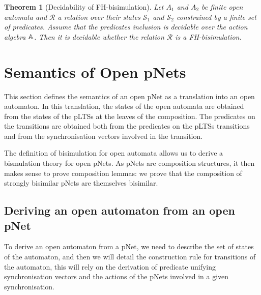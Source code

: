 \documentclass{lmcs}
\newtheorem{theorem}{Theorem}
\begin{document}
\begin{theorem}[Decidability of FH-bisimulation]
Let $A_1$ and $A_2$ be finite open automata
and $\mathcal{R}$ a relation over their states $\mathcal{S}_1$ and
$\mathcal{S}_2$ constrained by a finite set of predicates. Assume that
the predicates inclusion is decidable over  
the action algebra $\mathbb{A}$. Then it is decidable whether the relation 
$\mathcal{R}$ is a FH-bisimulation.
  
\end{theorem}



\section{Semantics of Open pNets}
\label{section:op-semantics}

This section defines the semantics of an open pNet as a translation into an open automaton. 
In this translation, the states of the open automata are obtained from
the states of the pLTSs at the leaves of the composition. The
predicates on the transitions are obtained both from the predicates on
the pLTSs transitions and from the synchronisation vectors involved in
the transition. 

The definition of bisimulation for open automata allows us to derive a
bismulation theory for open pNets. As pNets are composition
structures, it then makes sense to prove composition lemmas: we prove
that the composition of strongly bisimilar pNets are themselves
bisimilar. 

\subsection{Deriving an open automaton from an open pNet}
To derive an open automaton from a pNet, we need to describe the set of states of the automaton, and then we will detail the construction rule for transitions of the automaton, this will rely on the derivation of predicate unifying synchronisation vectors and the actions of the pNets involved in a given synchronisation.

\end{document}
